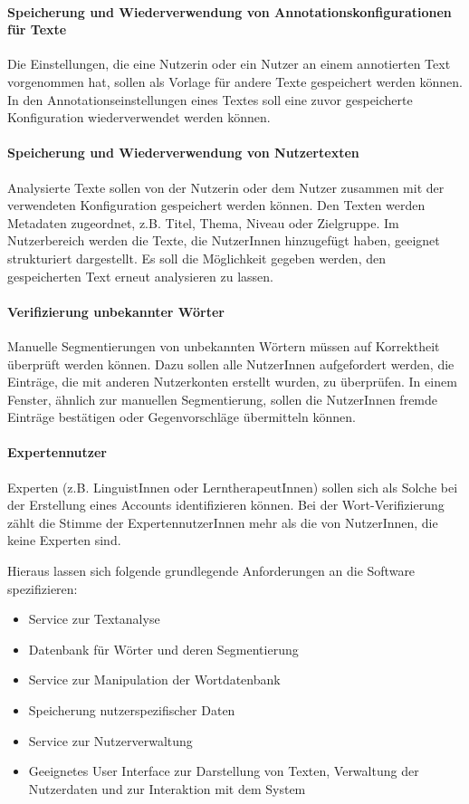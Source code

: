 \paragraph{Speicherung und Wiederverwendung von Annotationskonfigurationen für Texte}
Die Einstellungen, die eine Nutzerin oder ein Nutzer an einem annotierten Text vorgenommen hat, sollen als Vorlage für andere Texte gespeichert werden können. In den Annotationseinstellungen eines Textes soll eine zuvor gespeicherte Konfiguration wiederverwendet werden können.

\paragraph{Speicherung und Wiederverwendung von Nutzertexten}
Analysierte Texte sollen von der Nutzerin oder dem Nutzer zusammen mit der verwendeten Konfiguration gespeichert werden können. Den Texten werden Metadaten zugeordnet, z.B. Titel, Thema, Niveau oder Zielgruppe. Im Nutzerbereich werden die Texte, die NutzerInnen hinzugefügt haben, geeignet strukturiert dargestellt. Es soll die Möglichkeit gegeben werden, den gespeicherten Text erneut analysieren zu lassen.

\paragraph{Verifizierung unbekannter Wörter}
Manuelle Segmentierungen von unbekannten Wörtern müssen auf Korrektheit überprüft werden können. Dazu sollen alle NutzerInnen aufgefordert werden, die Einträge, die mit anderen Nutzerkonten erstellt wurden, zu überprüfen. In einem Fenster, ähnlich zur manuellen Segmentierung, sollen die NutzerInnen fremde Einträge bestätigen oder Gegenvorschläge übermitteln können.

\paragraph{Expertennutzer}
Experten (z.B. LinguistInnen oder LerntherapeutInnen) sollen sich als Solche bei der Erstellung eines Accounts identifizieren können. Bei der Wort-Verifizierung zählt die Stimme der ExpertennutzerInnen mehr als die von NutzerInnen, die keine Experten sind.

Hieraus lassen sich folgende grundlegende Anforderungen an die Software spezifizieren:

\begin{itemize}
	\item Service zur Textanalyse
	\item Datenbank für Wörter und deren Segmentierung
	\item Service zur Manipulation der Wortdatenbank
	\item Speicherung nutzerspezifischer Daten
	\item Service zur Nutzerverwaltung
	\item Geeignetes User Interface zur Darstellung von Texten, Verwaltung der Nutzerdaten und zur Interaktion mit dem System
\end{itemize}

